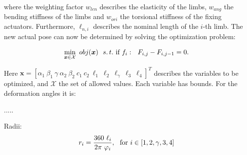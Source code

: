 \documentclass[10pt,a4paper]{article}
\begin{document}
where the weighting factor $w_{len}$ describes the elasticity of the limbs, $w_{ang}$ the bending stiffness of the limbs and $w_{ori}$ the torsional stiffness of the fixing actuators.
Furthermore, $\ell_{n,i}$ describes the nominal length of the $i$-th limb.
The new actual pose can now be determined by solving the optimization problem:

\begin{equation}
\min_{\bm{x} \in \mathcal{X}} ~ obj(\bm{x})~~ s.\,t.~ \textnormal{if}~f_i:~~F_{i,j} - F_{i,j-1} = 0.
\end{equation}


Here $\bm{x} = \left[ \alpha_1 ~ \beta_1 ~ \gamma ~ \alpha_2 ~ \beta_2 ~ c_1 ~ c_2 ~ \ell_1 ~ \ell_2 ~ \ell_\gamma ~ \ell_3 ~ \ell_4 \right]^T$ describes the variables to be optimized, and $\mathcal{X}$ the set of allowed values.
Each variable has bounds. 
For the deformation angles it is:

.....

Radii:
\begin{equation}
r_i = \frac{360 ~ \ell_i}{2 \pi ~ \varphi_i},~~ \textnormal{for}~ i \in [1,2,\gamma,3,4]
\end{equation}
\end{document}
